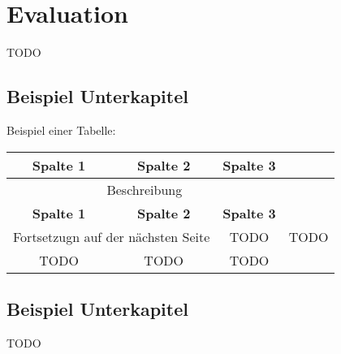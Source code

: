 \chapter{Evaluation}
\label{sec:evaluation}
TODO

\section{Beispiel Unterkapitel}
Beispiel einer Tabelle:
\begin{longtable}{|c|c|c|c|}
	\hline
	\multicolumn{1}{|c}{\textbf{Spalte 1}} &
	\multicolumn{1}{|c}{\textbf{Spalte 2}} &
	\multicolumn{1}{|c|}{\textbf{Spalte 3}} \\
	\hline
	\endfirsthead
	
	\multicolumn{3}{c}{Beschreibung}\\ \hline
	\multicolumn{1}{|c}{\textbf{Spalte 1}} &
	\multicolumn{1}{|c}{\textbf{Spalte 2}} &
	\multicolumn{1}{|c|}{\textbf{Spalte 3}} \\
	\hline
	\endhead
	
	\multicolumn{2}{c}{Fortsetzugn auf der nächsten Seite}
	\endfoot
	
	\caption{Beschreibung}
	\label{tab:example}
	\endlastfoot
	
	TODO & TODO & TODO \\ \hline
	TODO & TODO & TODO  \\ \hline
\end{longtable}

\section{Beispiel Unterkapitel}
TODO